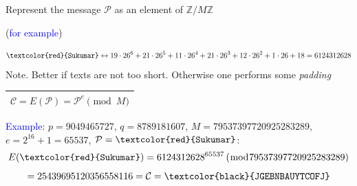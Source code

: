 \documentclass[landscape,handout]{powersem} %
\newcommand{\heading}[1]{%
 \begin{center}
  \large\bf
  \shadowbox{{\textcolor{conceptcolor}{#1}}}%
 \end{center}
 \vspace{1ex minus 1ex}}
\begin{document}
\begin{slide}
\heading{Alice: Encryption}\pause

Represent the message ${\mathcal P}$ as an element of  ${\mathbb Z}/M{\mathbb Z}$\pause

(\textcolor{blue}{for example})\pause
\begin{scriptsize}
$$\texttt{\textcolor{red}{Sukumar}}\leftrightarrow
19\cdot26^6+21\cdot26^5+11\cdot26^4+21\cdot26^3+12\cdot26^2+1\cdot26+18=
                          6124312628$$ Note. Better if texts are not too short. Otherwise one performs
some  \textsl{padding}
\end{scriptsize}\pause

\begin{Large}
\begin{center}\begin{tabular}{|c|}\hline
${\mathcal C}=E({\mathcal P})={\mathcal P}^e\pmod M$\\\hline\end{tabular}\end{center}
\end{Large}\pause

\scriptsize{ \textcolor{blue}{Example}: $p=9049465727$,
$q=8789181607$, $M=79537397720925283289 $, $e=2^{16}+1=65537$,
${\mathcal P}=\texttt{\textcolor{red}{Sukumar}}$:\pause
$$E(\texttt{\textcolor{red}{Sukumar}})=6124312628^{65537}\,(\bmod 79537397720925283289)$$
$$=25439695120356558116={\mathcal C}=\texttt{\textcolor{black}{JGEBNBAUYTCOFJ}}\hfill$$}
\end{slide}
\end{document}
